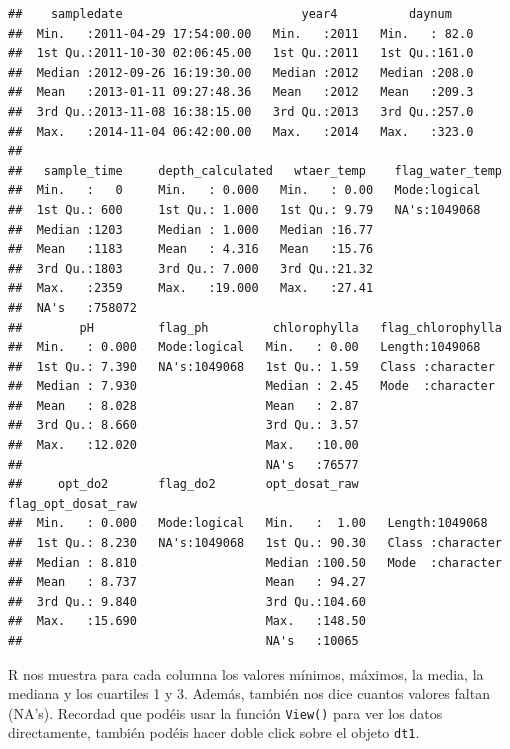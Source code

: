 \documentclass[
]{book}
\newcommand{\passthrough}[1]{#1}
\begin{document}
\begin{lstlisting}
##    sampledate                         year4          daynum     
##  Min.   :2011-04-29 17:54:00.00   Min.   :2011   Min.   : 82.0  
##  1st Qu.:2011-10-30 02:06:45.00   1st Qu.:2011   1st Qu.:161.0  
##  Median :2012-09-26 16:19:30.00   Median :2012   Median :208.0  
##  Mean   :2013-01-11 09:27:48.36   Mean   :2012   Mean   :209.3  
##  3rd Qu.:2013-11-08 16:38:15.00   3rd Qu.:2013   3rd Qu.:257.0  
##  Max.   :2014-11-04 06:42:00.00   Max.   :2014   Max.   :323.0  
##                                                                 
##   sample_time     depth_calculated   wtaer_temp    flag_water_temp
##  Min.   :   0     Min.   : 0.000   Min.   : 0.00   Mode:logical   
##  1st Qu.: 600     1st Qu.: 1.000   1st Qu.: 9.79   NA's:1049068   
##  Median :1203     Median : 1.000   Median :16.77                  
##  Mean   :1183     Mean   : 4.316   Mean   :15.76                  
##  3rd Qu.:1803     3rd Qu.: 7.000   3rd Qu.:21.32                  
##  Max.   :2359     Max.   :19.000   Max.   :27.41                  
##  NA's   :758072                                                   
##        pH         flag_ph         chlorophylla   flag_chlorophylla 
##  Min.   : 0.000   Mode:logical   Min.   : 0.00   Length:1049068    
##  1st Qu.: 7.390   NA's:1049068   1st Qu.: 1.59   Class :character  
##  Median : 7.930                  Median : 2.45   Mode  :character  
##  Mean   : 8.028                  Mean   : 2.87                     
##  3rd Qu.: 8.660                  3rd Qu.: 3.57                     
##  Max.   :12.020                  Max.   :10.00                     
##                                  NA's   :76577                     
##     opt_do2       flag_do2       opt_dosat_raw    flag_opt_dosat_raw
##  Min.   : 0.000   Mode:logical   Min.   :  1.00   Length:1049068    
##  1st Qu.: 8.230   NA's:1049068   1st Qu.: 90.30   Class :character  
##  Median : 8.810                  Median :100.50   Mode  :character  
##  Mean   : 8.737                  Mean   : 94.27                     
##  3rd Qu.: 9.840                  3rd Qu.:104.60                     
##  Max.   :15.690                  Max.   :148.50                     
##                                  NA's   :10065
\end{lstlisting}

R nos muestra para cada columna los valores mínimos, máximos, la media, la mediana y los cuartiles 1 y 3. Además, también nos dice cuantos valores faltan (NA's). Recordad que podéis usar la función \passthrough{\lstinline!View()!} para ver los datos directamente, también podéis hacer doble click sobre el objeto \passthrough{\lstinline!dt1!}.
\end{document}
